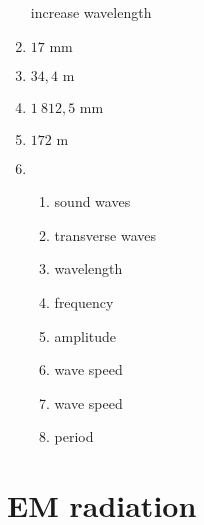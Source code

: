 \begin{multicols}{5}
\begin{enumerate}[itemsep=5pt, label=\textbf{\arabic*}. ]
increase wavelength
\item %
$17 \text{ mm}$
\item %
$34,4 \text{ m}$
\item %
$1~812,5 \text{ mm}$
\item %
$172 \text{ m}$
\item %
    \begin{enumerate}[noitemsep, label=\textbf{(\alph*)} ]
    \item sound waves
    \item transverse waves
\item wavelength
\item frequency
    \item amplitude
    \item wave speed
\item wave speed
\item period
    \end{enumerate}
  \end{enumerate}
\end{multicols}

\section{EM radiation}
% 
% 

